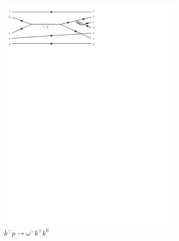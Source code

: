 \begin{figure}[h]
\begin{subfigure}[b]{0.3\textwidth}
    \includegraphics[trim={0.5cm 22cm 10cm 0cm},width=\textwidth]{../Diagrams/D6.pdf}
    \caption{$k^-p\rightarrow \omega^-k^+k^0$}
    \label{fey:6}
  \end{subfigure}
  \newline
  \newline
  \begin{subfigure}[b]{0.3\textwidth}

\end{subfigure}
\end{figure}
